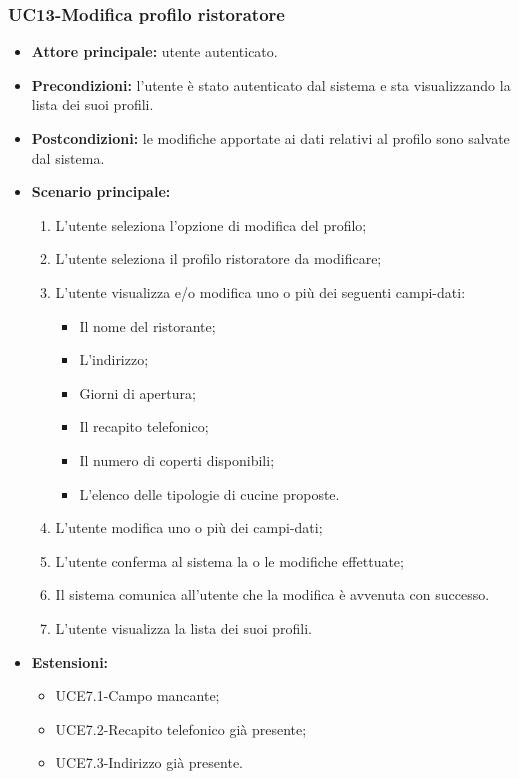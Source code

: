 \subsubsection{UC13-Modifica profilo ristoratore}
\begin{itemize}
\item \textbf{Attore principale:} utente autenticato.
\item \textbf{Precondizioni:} l'utente è stato autenticato dal sistema e sta visualizzando la lista dei suoi profili.
\item \textbf{Postcondizioni:} le modifiche apportate ai dati relativi al profilo sono salvate dal sistema.
\item \textbf{Scenario principale:}
\begin{enumerate}
    \item L'utente seleziona l'opzione di modifica del profilo;
    \item L'utente seleziona il profilo ristoratore da modificare;
    \item L'utente visualizza e/o modifica uno o più dei seguenti campi-dati:
        \begin{itemize}
            \item Il nome del ristorante;
            \item L'indirizzo;
            \item Giorni di apertura;
            \item Il recapito telefonico;
            \item Il numero di coperti disponibili;
            \item L'elenco delle tipologie di cucine proposte.
        \end{itemize}
    \item L'utente modifica uno o più dei campi-dati;
    \item L'utente conferma al sistema la o le modifiche effettuate;
    \item Il sistema comunica all'utente che la modifica è avvenuta con successo.
    \item L'utente visualizza la lista dei suoi profili.
\end{enumerate}
        \item \textbf{Estensioni:}
        \begin{itemize}
                \item UCE7.1-Campo mancante;
                \item UCE7.2-Recapito telefonico già presente;
                \item UCE7.3-Indirizzo già presente.
        \end{itemize}
\end{itemize}


